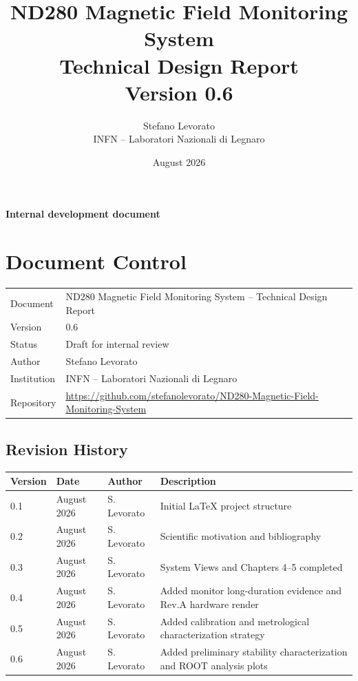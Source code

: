 \documentclass[a4paper,11pt,oneside]{report}
\title{
  \vspace{1.5cm}
  \textbf{ND280 Magnetic Field Monitoring System}\\[0.5cm]
  \Large Technical Design Report\\[0.5cm]
  \large Version 0.6
}
\author{
  Stefano Levorato\\
  INFN -- Laboratori Nazionali di Legnaro
}
\date{August 2026}
\begin{document}
\maketitle
\vfill
\begin{center}
\textbf{Internal development document}
\end{center}
\newpage

\chapter*{Document Control}
\begin{tabular}{ll}
\toprule
Document & ND280 Magnetic Field Monitoring System -- Technical Design Report \\
Version & 0.6 \\
Status & Draft for internal review \\
Author & Stefano Levorato \\
Institution & INFN -- Laboratori Nazionali di Legnaro \\
Repository & \url{https://github.com/stefanolevorato/ND280-Magnetic-Field-Monitoring-System} \\
\bottomrule
\end{tabular}

\vspace{1cm}
\section*{Revision History}
\begin{tabular}{llll}
\toprule
Version & Date & Author & Description \\
\midrule
0.1 & August 2026 & S. Levorato & Initial LaTeX project structure \\
0.2 & August 2026 & S. Levorato & Scientific motivation and bibliography \\
0.3 & August 2026 & S. Levorato & System Views and Chapters 4--5 completed \\
0.4 & August 2026 & S. Levorato & Added monitor long-duration evidence and Rev.A hardware render \\
0.5 & August 2026 & S. Levorato & Added calibration and metrological characterization strategy \\
0.6 & August 2026 & S. Levorato & Added preliminary stability characterization and ROOT analysis plots \\
\bottomrule
\end{tabular}
\end{document}
